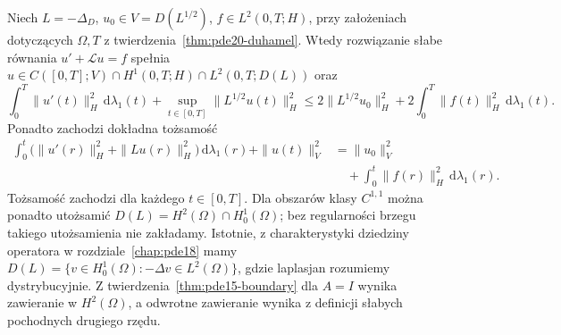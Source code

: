 \begin{twierdzenie}\label{thm:pde20-max-reg}
Niech $L=-\Delta_D$, $u_0\in V=D(L^{1/2})$,
$f\in L^2(0,T;H)$, przy założeniach dotyczących
$\Omega,T$ z twierdzenia~\ref{thm:pde20-duhamel}.
Wtedy rozwiązanie słabe równania
$u'+\mathcal Lu=f$ spełnia
$u\in C([0,T];V)\cap H^1(0,T;H)\cap L^2(0,T;D(L))$ oraz
\[
 \int_0^T\|u'(t)\|_H^2\,\mathrm d\lambda_1(t)
 +\sup_{t\in[0,T]}\|L^{1/2}u(t)\|_H^2
 \le2\|L^{1/2}u_0\|_H^2
 +2\int_0^T\|f(t)\|_H^2\,\mathrm d\lambda_1(t).
\]
Ponadto zachodzi dokładna tożsamość
\[
 \begin{split}
 \int_0^t\bigl(\|u'(r)\|_H^2+\|Lu(r)\|_H^2\bigr)
 \,\mathrm d\lambda_1(r)+\|u(t)\|_V^2
 &=\|u_0\|_V^2\\
 &\quad+\int_0^t\|f(r)\|_H^2\,\mathrm d\lambda_1(r).
 \end{split}
\]
Tożsamość zachodzi dla każdego $t\in[0,T]$.
Dla obszarów klasy $C^{1,1}$ można ponadto utożsamić
$D(L)=H^2(\Omega)\cap H_0^1(\Omega)$; bez regularności brzegu
takiego utożsamienia nie zakładamy. Istotnie, z charakterystyki
dziedziny operatora w rozdziale~\ref{chap:pde18}
mamy $D(L)=\{v\in H_0^1(\Omega):-\Delta v\in L^2(\Omega)\}$,
gdzie laplasjan rozumiemy dystrybucyjnie.
Z twierdzenia~\ref{thm:pde15-boundary} dla $A=I$
wynika zawieranie w $H^2(\Omega)$, a odwrotne zawieranie
wynika z definicji słabych pochodnych drugiego rzędu.
\end{twierdzenie}
